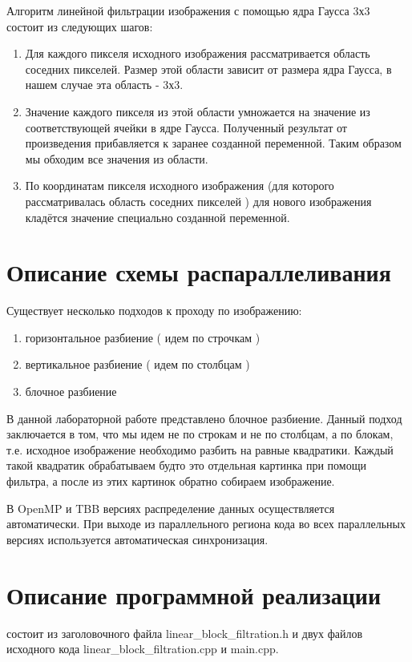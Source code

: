 \documentclass{report}
\begin{document}
\par Алгоритм линейной фильтрации изображения с помощью ядра Гаусса 3х3 состоит из следующих шагов:
\begin{enumerate}
\item Для каждого пикселя исходного изображения рассматривается область соседних пикселей. Размер этой области зависит от размера ядра Гаусса, в нашем случае эта область - 3х3.
\item  Значение каждого пикселя из этой области умножается на значение из соответствующей ячейки в ядре Гаусса. Полученный результат от произведения прибавляется к заранее созданной переменной. Таким образом  мы обходим все значения из области.
\item По координатам пикселя исходного изображения (для которого рассматривалась область соседних пикселей ) для нового изображения кладётся значение специально созданной переменной.
 
\end{enumerate}
\newpage

\section*{Описание схемы распараллеливания}
\par Существует несколько подходов к проходу по изображению:
\begin{enumerate}
\item горизонтальное разбиение ( идем по строчкам )
\item вертикальное разбиение ( идем по столбцам )
\item блочное разбиение
\end{enumerate}
\par В данной лабораторной работе представлено блочное разбиение. Данный подход заключается в том, что мы идем не по строкам и не по столбцам, а по блокам, т.е. исходное изображение необходимо разбить на равные квадратики. Каждый такой квадратик обрабатываем будто это отдельная картинка при помощи фильтра, а после из этих картинок обратно собираем изображение.
\par В OpenMP и TBB версиях распределение данных осуществляется автоматически. При выходе из параллельного региона кода во всех параллельных версиях используется автоматическая синхронизация.

\newpage

\section*{Описание программной реализации}
 состоит из заголовочного файла linear\_block\_filtration.h и двух файлов исходного кода  linear\_block\_filtration.cpp и main.cpp. 
\end{document}
